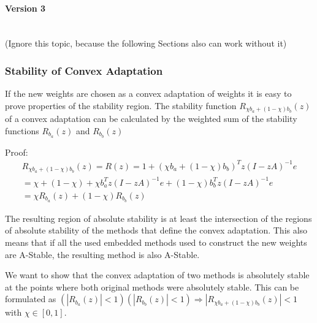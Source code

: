 \documentclass[a4paper]{article}
\numberwithin{equation}{section}
\theoremstyle{plain}
\theoremstyle{definition}
\numberwithin{theorem}{section}
\newcommand{\1}{\mathbbm{1}}
\begin{document}
\paragraph*{Version 3} $ $\\
(Ignore this topic, because the following Sections also can work without it)



\subsubsection{Stability of Convex Adaptation}
If the new weights are chosen as a convex adaptation of weights it is easy to prove properties of the stability region.
The stability function $R_{\chi b_a + (1-\chi) b_b}(z)$ of a convex adaptation can be calculated by the weighted sum of the stability functions $R_{b_a}(z)$ and $R_{b_b}(z)$

Proof:
\begin{multline}
R_{\chi b_a + (1-\chi) b_b}(z) = R(z) = 1 + (\chi b_a + (1-\chi) b_b)^Tz(I - zA)^{-1}e \\
= \chi + (1-\chi) + \chi b_a ^Tz(I - zA)^{-1}e + (1-\chi) b_b^Tz(I - zA)^{-1}e \\
= \chi R_{b_a}(z) + (1-\chi) R_{b_b}(z)
\end{multline}

The resulting region of absolute stability is at least the intersection of the regions of absolute stability of the methods that define the convex adaptation. This also means that if all the used embedded methods used to construct the new weights are A-Stable, the resulting method is also A-Stable.

We want to show that the convex adaptation of two methods is absolutely stable at the points where both original methods were absolutely stable.
This can be formulated as $(|R_{b_a}(z)|  < 1) (|R_{b_b}(z)| < 1) \Rightarrow |R_{\chi b_a +(1- \chi) b_b}(z)| < 1$ with $\chi \in [0,1]$.
\end{document}
